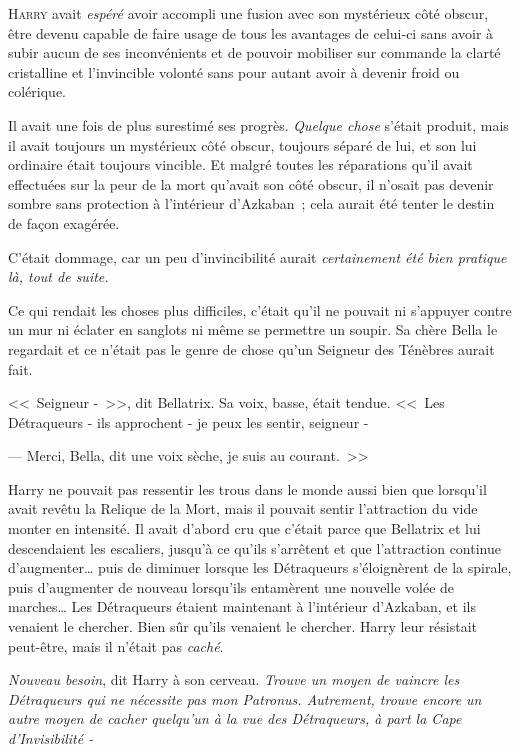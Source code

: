 
\lettrine{H}{arry} avait \emph{espéré} avoir accompli une fusion avec son mystérieux côté obscur, être devenu capable de faire usage de tous les avantages de celui-ci sans avoir à subir aucun de ses inconvénients et de pouvoir mobiliser sur commande la clarté cristalline et l'invincible volonté sans pour autant avoir à devenir froid ou colérique.

Il avait une fois de plus surestimé ses progrès. \emph{Quelque chose} s'était produit, mais il avait toujours un mystérieux côté obscur, toujours séparé de lui, et son lui ordinaire était toujours vincible. Et malgré toutes les réparations qu'il avait effectuées sur la peur de la mort qu'avait son côté obscur, il n'osait pas devenir sombre sans protection à l'intérieur d'Azkaban~; cela aurait été tenter le destin de façon exagérée.

C'était dommage, car un peu d'invincibilité aurait \emph{certainement été bien pratique là, tout de suite.}

Ce qui rendait les choses plus difficiles, c'était qu'il ne pouvait ni s'appuyer contre un mur ni éclater en sanglots ni même se permettre un soupir. Sa chère Bella le regardait et ce n'était pas le genre de chose qu'un Seigneur des Ténèbres aurait fait.

<<~Seigneur -~>>, dit Bellatrix. Sa voix, basse, était tendue. <<~Les Détraqueurs - ils approchent - je peux les sentir, seigneur -

--- Merci, Bella, dit une voix sèche, je suis au courant.~>>

Harry ne pouvait pas ressentir les trous dans le monde aussi bien que lorsqu'il avait revêtu la Relique de la Mort, mais il pouvait sentir l'attraction du vide monter en intensité. Il avait d'abord cru que c'était parce que Bellatrix et lui descendaient les escaliers, jusqu'à ce qu'ils s'arrêtent et que l'attraction continue d'augmenter… puis de diminuer lorsque les Détraqueurs s'éloignèrent de la spirale, puis d'augmenter de nouveau lorsqu'ils entamèrent une nouvelle volée de marches… Les Détraqueurs étaient maintenant à l'intérieur d'Azkaban, et ils venaient le chercher. Bien sûr qu'ils venaient le chercher. Harry leur résistait peut-être, mais il n'était pas \emph{caché}.

\emph{Nouveau besoin}, dit Harry à son cerveau. \emph{Trouve un moyen de vaincre les Détraqueurs qui ne nécessite pas mon Patronus. Autrement, trouve encore un autre moyen de cacher quelqu'un à la vue des Détraqueurs, à part la Cape d'Invisibilité -}

